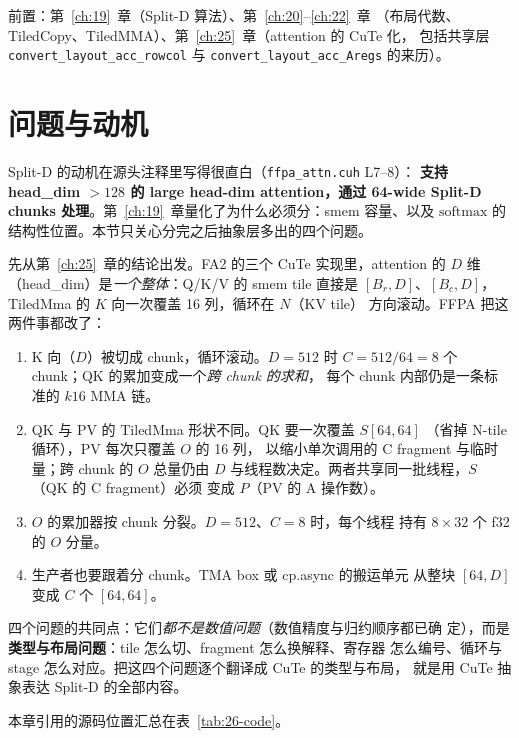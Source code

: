 前置：第~\ref{ch:19}~章（Split-D 算法）、第~\ref{ch:20}--\ref{ch:22}~章
（布局代数、TiledCopy、TiledMMA）、第~\ref{ch:25}~章（attention 的 CuTe 化，
包括共享层 \texttt{convert\_\allowbreak{}layout\_\allowbreak{}acc\_\allowbreak{}rowcol} 与 \texttt{convert\_\allowbreak{}layout\_\allowbreak{}acc\_\allowbreak{}Aregs}
的来历）。

\section{问题与动机}

Split-D 的动机在源头注释里写得很直白（\texttt{ffpa\_\allowbreak{}attn.\allowbreak{}cuh} L7--8）：
\textbf{支持 head\_dim $>128$ 的 large head-dim attention，通过 64-wide Split-D
chunks 处理}。第~\ref{ch:19}~章量化了为什么必须分：smem 容量、以及
$\mathrm{softmax}$ 的结构性位置。本节只关心分完之后抽象层多出的四个问题。

先从第~\ref{ch:25}~章的结论出发。FA2 的三个 CuTe 实现里，attention 的
$D$ 维（head\_dim）是\emph{一个整体}：Q/K/V 的 smem tile 直接是
$[B_r, D]$、$[B_c, D]$，TiledMma 的 $K$ 向一次覆盖 16 列，循环在 $N$（KV tile）
方向滚动。FFPA 把这两件事都改了：

\begin{enumerate}[itemsep=3pt,topsep=3pt]
  \item K 向（$D$）被切成 chunk，循环滚动。$D=512$ 时
        $C = 512/64 = 8$ 个 chunk；QK 的累加变成一个\emph{跨 chunk 的求和}，
        每个 chunk 内部仍是一条标准的 $k16$ MMA 链。
  \item QK 与 PV 的 TiledMma 形状不同。QK 要一次覆盖 $S[64,64]$
        （省掉 N-tile 循环），PV 每次只覆盖 $O$ 的 16 列，
        以缩小单次调用的 C fragment 与临时量；跨 chunk 的 $O$ 总量仍由
        $D$ 与线程数决定。两者共享同一批线程，$S$（QK 的 C fragment）必须
        变成 $P$（PV 的 A 操作数）。
  \item $O$ 的累加器按 chunk 分裂。$D=512$、$C=8$ 时，每个线程
        持有 $8\times32$ 个 f32 的 $O$ 分量。
  \item 生产者也要跟着分 chunk。TMA box 或 cp.async 的搬运单元
        从整块 $[64,D]$ 变成 $C$ 个 $[64,64]$。
\end{enumerate}

四个问题的共同点：它们\emph{都不是数值问题}（数值精度与归约顺序都已确
定），而是\textbf{类型与布局问题}：tile 怎么切、fragment 怎么换解释、寄存器
怎么编号、循环与 stage 怎么对应。把这四个问题逐个翻译成 CuTe 的类型与布局，
就是用 CuTe 抽象表达 Split-D 的全部内容。

本章引用的源码位置汇总在表~\ref{tab:26-code}。

